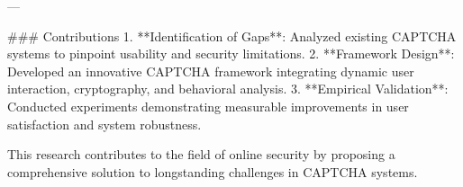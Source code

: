 ---

### Contributions  
1. **Identification of Gaps**: Analyzed existing CAPTCHA systems to pinpoint usability and security limitations.  
2. **Framework Design**: Developed an innovative CAPTCHA framework integrating dynamic user interaction, cryptography, and behavioral analysis.  
3. **Empirical Validation**: Conducted experiments demonstrating measurable improvements in user satisfaction and system robustness.  

This research contributes to the field of online security by proposing a comprehensive solution to longstanding challenges in CAPTCHA systems.